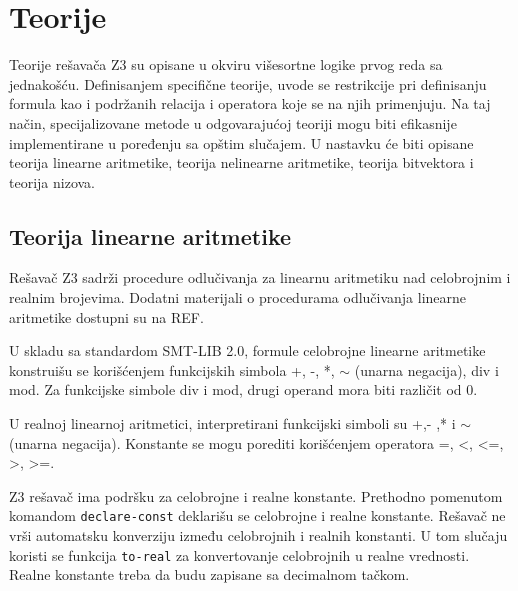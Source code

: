\documentclass[12pt,oneside]{memoir}
\begin{document}
\section{Teorije} \label{sec:num2}
Teorije rešavača Z3 su opisane u okviru višesortne logike prvog reda sa jednakošću.  Definisanjem specifične teorije, uvode se restrikcije pri definisanju formula kao i podržanih relacija i operatora koje se na njih primenjuju. Na taj način, specijalizovane metode u odgovarajućoj teoriji mogu biti efikasnije implementirane u poređenju sa opštim slučajem. U nastavku će biti opisane teorija linearne aritmetike, teorija nelinearne aritmetike, teorija bitvektora i teorija nizova.

\subsection{Teorija linearne aritmetike} 

Rešavač Z3 sadrži procedure odlučivanja za linearnu aritmetiku nad celobrojnim i realnim brojevima. Dodatni materijali o procedurama odlučivanja linearne aritmetike dostupni su na REF.
\par

U skladu sa standardom SMT-LIB 2.0, formule celobrojne linearne aritmetike konstruišu se korišćenjem funkcijskih simbola +, -, *, $\sim$ (unarna negacija), div i mod. Za funkcijske simbole div i mod, drugi operand mora biti različit od 0. 

U realnoj linearnoj aritmetici, interpretirani funkcijski simboli su +,- ,* i $\sim$(unarna negacija). Konstante se mogu porediti korišćenjem operatora =, <, <=, >, >=. 
\\
\par
Z3 rešavač ima podršku za celobrojne i realne konstante. Prethodno pomenutom komandom \texttt{declare-const} deklarišu se celobrojne i realne konstante. Rešavač ne vrši automatsku konverziju između celobrojnih i realnih konstanti. U tom slučaju koristi se funkcija \texttt{to-real} za konvertovanje celobrojnih u realne vrednosti.
Realne konstante treba da budu zapisane sa decimalnom tačkom.
\end{document}
